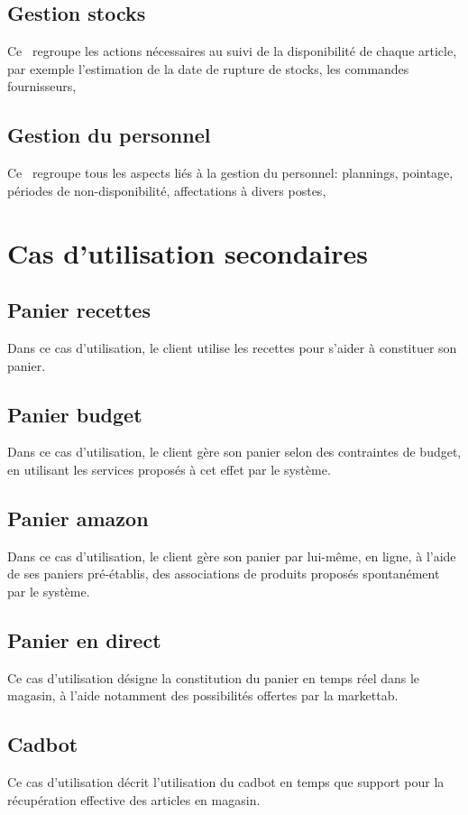 \subsection{Gestion stocks}
Ce \cu\ regroupe les actions nécessaires au suivi de la disponibilité de chaque article, par exemple l'estimation de la date de rupture de stocks, les commandes fournisseurs, \etc

\subsection{Gestion du personnel}
Ce \cu\ regroupe tous les aspects liés à la gestion du personnel: plannings, pointage, périodes de non-disponibilité, affectations à divers postes, \etc

\section{Cas d'utilisation secondaires}

\subsection{Panier recettes}
Dans ce cas d'utilisation, le client utilise les recettes pour s'aider à constituer son panier.

\subsection{Panier budget}
Dans ce cas d'utilisation, le client gère son panier selon des contraintes de budget, en utilisant les services proposés à cet effet par le système.

\subsection{Panier amazon}
Dans ce cas d'utilisation, le client gère son panier par lui-même, en ligne, à l'aide de ses paniers pré-établis, des associations de produits proposés spontanément par le système.

\subsection{Panier en direct}
Ce cas d'utilisation désigne la constitution du panier en temps réel dans le magasin, à l'aide notamment des possibilités offertes par la markettab.

\subsection{Cadbot}
Ce cas d'utilisation décrit l'utilisation du cadbot en temps que support pour la récupération effective des articles en magasin.

